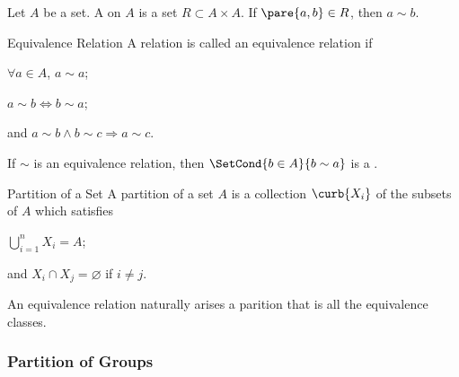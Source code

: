 \documentclass[hidelinks]{article}
\begin{document}
Let $A$ be a set. A  on $A$ is a set $R\subset A\times A$. If $\pare{a,b} \in R$, then $a\sim b$.
\begin{termdef}[\baselineskip]{Equivalence Relation}
    A relation is called an equivalence relation if
    \begin{cenum}
        \item $\forall a\in A$, $a\sim a$;
        \item $a\sim b \Leftrightarrow b\sim a$;
        \item and $a\sim b \land b\sim c\Rightarrow a\sim c$.
    \end{cenum}
\end{termdef}
If $\sim$ is an equivalence relation, then $\SetCond{b\in A}{b\sim a}$ is a .
\begin{termdef}[\baselineskip]{Partition of a Set}
    A partition of a set $A$ is a collection $\curb{X_i}$ of the subsets of $A$ which satisfies
    \begin{cenum}
        \item $\displaystyle \bigcup_{i=1}^n X_i = A$;
        \item and $X_i \cap X_j = \varnothing$ if $i\neq j$.
    \end{cenum}
\end{termdef}
An equivalence relation naturally arises a parition that is all the equivalence classes.


\subsubsection{Partition of Groups} %
\label{ssub:partition_of_groups}
\end{document}
